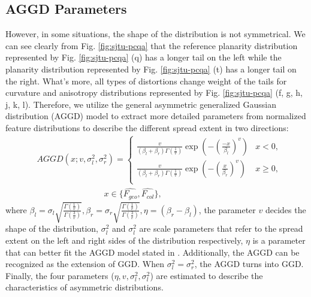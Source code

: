 \documentclass[lettersize,journal]{IEEEtran}
\begin{document}
\subsection{AGGD Parameters}
However, in some situations, the shape of the distribution is not symmetrical. We can see clearly from Fig. \ref{fig:sjtu-pcqa} that the reference planarity distribution represented by Fig. \ref{fig:sjtu-pcqa} (q) has a longer tail on the left while the planarity distribution represented by Fig. \ref{fig:sjtu-pcqa} (t) has a longer tail on the right. What's more, all types of distortions change weight of the tails for curvature and anisotropy distributions represented by Fig. \ref{fig:sjtu-pcqa} (f, g, h, j, k, l). Therefore, we utilize the general asymmetric generalized Gaussian distribution (AGGD) model to extract more detailed parameters from normalized feature distributions to describe the different spread extent in two directions:
\begin{equation}
\begin{aligned}
&AGGD\!\left(x ; v, \sigma_{l}^{2}, \sigma_{r}^{2}\right)\!=\!\left\{\begin{array}{ll}
\!\!\!\frac{v}{\left(\beta_{l}+\beta_{r}\right) \Gamma\left(\frac{1}{v}\right)} \exp \left(-\left(\frac{-x}{\beta_{l}}\right)^{v}\right)\! & \!\!\!x<0, \\
\!\!\!\frac{v}{\left(\beta_{l}+\beta_{r}\right) \Gamma\left(\frac{1}{v}\right)} \exp \left(-\left(\frac{x}{\beta_{r}}\right)^{v}\right)\! & \!\!\!x \geq 0,\\
\end{array}\right.\\
&\quad \quad \quad \quad \qquad \qquad x \in \{\hat{F_{geo}}, \hat{F_{col}}\},
\end{aligned}
\label{equ:aggd1}
\end{equation}
where $\beta_{l} =\sigma_{l} \sqrt{\frac{\Gamma\left(\frac{1}{v}\right)}{\Gamma\left(\frac{3}{v}\right)}},
\beta_{r} =\sigma_{r} \sqrt{\frac{\Gamma\left(\frac{1}{v}\right)}{\Gamma\left(\frac{3}{v}\right)}}, \eta=\left(\beta_{r}-\beta_{l}\right)$,  the parameter $v$ decides the shape of the distribution, $\sigma_{l}^{2}$ and $\sigma_{l}^{2}$ are scale parameters that refer to the spread extent on the left and right sides of the distribution respectively, $\eta$ is a parameter that can better fit the AGGD model stated in \cite{brisque}. Additionally, the AGGD can be recognized as the extension of GGD. When $\sigma_{l}^{2}= \sigma_{r}^{2}$, the AGGD turns into GGD. Finally, the four parameters ($\eta, v,\sigma_{l}^{2},\sigma_{l}^{2}$) are estimated to describe the  characteristics of asymmetric distributions.
\end{document}
